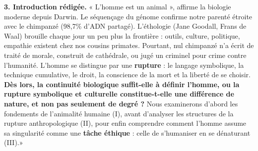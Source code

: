 \documentclass[11pt]{article}
\begin{document}
\begin{exoresolu}
\textbf{3. Introduction rédigée.}
« L'homme est un animal », affirme la biologie moderne depuis Darwin. Le séquençage du génome confirme notre parenté étroite avec le chimpanzé (98,7\% d'ADN partagé). L'éthologie (Jane Goodall, Frans de Waal) brouille chaque jour un peu plus la frontière : outils, culture, politique, empathie existent chez nos cousins primates. Pourtant, nul chimpanzé n'a écrit de traité de morale, construit de cathédrale, ou jugé un criminel pour crime contre l'humanité. L'homme se distingue par une \textbf{rupture} : le langage symbolique, la technique cumulative, le droit, la conscience de la mort et la liberté de se choisir. \textbf{Dès lors, la continuité biologique suffit-elle à définir l'homme, ou la rupture symbolique et culturelle constitue-t-elle une différence de nature, et non pas seulement de degré ?} Nous examinerons d'abord les fondements de l'animalité humaine (I), avant d'analyser les structures de la rupture anthropologique (II), pour enfin comprendre comment l'homme assume sa singularité comme une \textbf{tâche éthique} : celle de s'humaniser en se dénaturant (III).»
\end{exoresolu}
\end{document}
